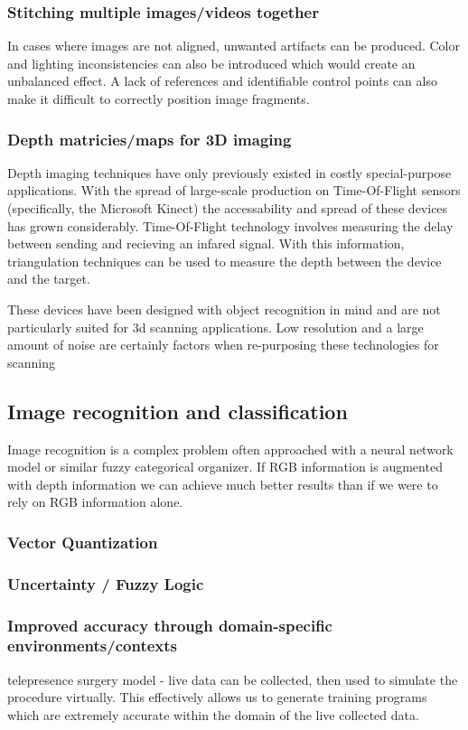\documentclass[a4paper,12pt]{report}
\begin{document}
\subsubsection{Stitching multiple images/videos together}
In cases where images are not aligned, unwanted artifacts can be produced. Color and lighting inconsistencies can also be introduced which would create an unbalanced effect. A lack of references and identifiable control points can also make it difficult to correctly position image fragments. \cite{4359344}

\cite{5397590}
\subsubsection{Depth matricies/maps for 3D imaging}
Depth imaging techniques have only previously existed in costly special-purpose applications. With the spread of large-scale production on Time-Of-Flight sensors (specifically, the Microsoft Kinect) the accessability and spread of these devices has grown considerably. Time-Of-Flight technology involves measuring the delay between sending and recieving an infared signal. With this information, triangulation techniques can be used to measure the depth between the device and the target. 

These devices have been designed with object recognition in mind and are not particularly suited for 3d scanning applications. Low resolution and a large amount of noise are certainly factors when re-purposing these technologies for scanning\cite{6296662} 
\subsection{Image recognition and classification}
Image recognition is a complex problem often approached with a neural network model or similar fuzzy categorical organizer. If RGB information is augmented with depth information we can achieve much better results than if we were to rely on RGB information alone.
\subsubsection{Vector Quantization}
\subsubsection{Uncertainty / Fuzzy Logic}
\subsubsection{Improved accuracy through domain-specific environments/contexts}
telepresence surgery model - live data can be collected, then used to simulate the procedure virtually. 
This effectively allows us to generate training programs which are extremely accurate within the domain of the live collected data.
\end{document}
